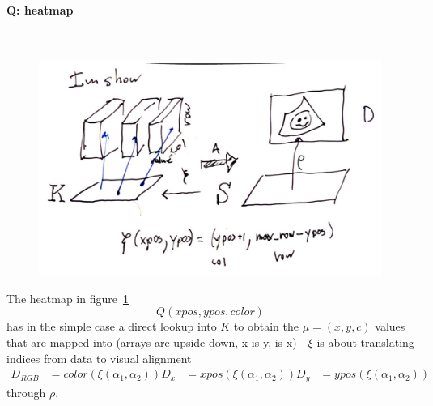 \documentclass[../main.tex]{subfiles}
\begin{document}
\paragraph{Q: heatmap}\mbox{} \\
\label{sec:artist_example_heatmap}
\begin{figure}[H]
    \includegraphics[width=\textwidth]{figures/math/heatmap.png}
    \label{fig:artist_heatmap}
\end{figure}
The heatmap in figure~\ref{fig:artist_heatmap} 
\begin{equation}
Q(xpos, ypos, color)
\end{equation}
has in the simple case a direct lookup into $K$ to obtain the $\mu = (x,y,c)$ values that are mapped into 
(arrays are upside down, x is y, is x) - $\xi$ is about translating indices from data to visual alignment
\begin{align}
D_{RGB} &= color(\xi(\alpha_1, \alpha_2))
D_x & = xpos(\xi(\alpha_1, \alpha_2))
D_y &= ypos(\xi(\alpha_1, \alpha_2))
\end{align}
through $\rho$. 
\end{document}
